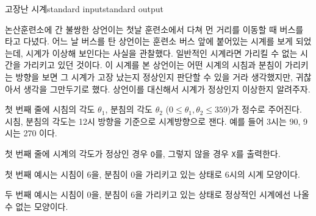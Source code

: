 \begin{problem}{고장난 시계}{standard input}{standard output}

논산훈련소에 간 불쌍한 상언이는 첫날 훈련소에서 다쳐 먼 거리를 이동할 때 버스를 타고 다녔다. 어느 날 버스를 탄 상언이는 훈련소 버스 앞에 붙어있는 시계를 보게 되었는데, 시계가 이상해 보인다는 사실을 관찰했다. 일반적인 시계라면 가리킬 수 없는 시간을 가리키고 있던 것이다. 이 시계를 본 상언이는 어떤 시계의 시침과 분침이 가리키는 방향을 보면 그 시계가 고장 났는지 정상인지 판단할 수 있을 거라 생각했지만, 귀찮아서 생각을 그만두기로 했다. 상언이를 대신해서 시계가 정상인지 이상한지 알려주자.


\InputFile
첫 번째 줄에 시침의 각도 $\theta_1$, 분침의 각도 $\theta_2$ ($0 \le \theta_1, \theta_2 \le 359$)가 정수로 주어진다.
시침, 분침의 각도는 12시 방향을 기준으로 시계방향으로 잰다. 예를 들어 3시는 90, 9시는 270 이다.

\OutputFile
첫 번째 줄에 시계의 각도가 정상인 경우 \texttt{O}를, 그렇지 않을 경우 \texttt{X}를 출력한다.

\Example

\begin{example}
%
%
\end{example}

\Notes
첫 번째 예시는 시침이 6을, 분침이 0을 가리키고 있는 상태로 6시의 시계 모양이다.

두 번째 예시는 시침이 0을, 분침이 6을 가리키고 있는 상태로 정상적인 시계에선 나올 수 없는 모양이다.

\end{problem}
